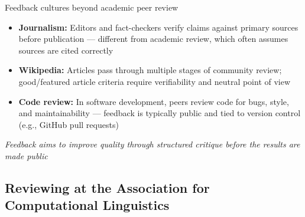 \documentclass[aspectratio=169]{beamer}
\begin{document}
\begin{frame}{Feedback cultures beyond academic peer review}
\begin{itemize}
  \item \textbf{Journalism:} Editors and fact-checkers verify claims against primary sources before publication — different from academic review, which often assumes sources are cited correctly
  \item \textbf{Wikipedia:} Articles pass through multiple stages of community review; good/featured article criteria require verifiability and neutral point of view
  \item \textbf{Code review:} In software development, peers review code for bugs, style, and maintainability — feedback is typically public and tied to version control (e.g., GitHub pull requests)
  \end{itemize}
\medskip
  \textit{Feedback aims to improve quality through structured critique before the results are made public}
\end{frame}


\subsection{Reviewing at the Association for Computational Linguistics}
\end{document}
